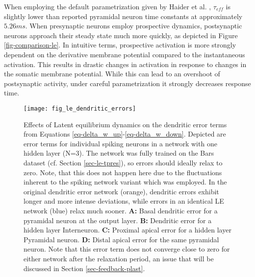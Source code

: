 When employing the default parametrization given by Haider et al. , $\tau_{eff}$ is
slightly lower than reported pyramidal neuron time constants \citep{McCormick1985} at approximately $5.26ms$. When
presynaptic neurons employ prospective dynamics, postsynaptic neurons approach their steady state much more quickly, as
depicted in Figure \ref{fig-comparison-le}. In intuitive terms, prospective activation is more strongly dependent on the
derivative membrane potential compared to the instantaneous activation. This results in drastic changes in activation
in response to changes in the somatic membrane potential. While this can lead to an overshoot of postsynaptic activity,
under careful parametrization it strongly decreases response time.   


\begin{figure}[h]
  \centering
  \texttt{[image: fig\_le\_dendritic\_errors]}
  \caption{Effects of Latent equilibrium dynamics on the dendritic error terms from Equations
    \ref{eq-delta_w_up}-\ref{eq-delta_w_down}. Depicted are error terms for individual spiking neurons in a network with
    one hidden layer (N=3). The network was fully trained on the Bars dataset (cf. Section \ref{sec-le-tpres}), so
    errors should ideally relax to zero. Note, that this does not happen here due to the fluctuations inherent to the
    spiking network variant which was employed. In the original dendritic error network (orange), dendritic errors
    exhibit longer and more intense deviations, while errors in an identical LE network (blue) relax much sooner.
    \textbf{A:} Basal dendritic error for a pyramidal neuron at the output layer. \textbf{B:} Dendritic error for a
    hidden layer Interneuron. \textbf{C:} Proximal apical error for a hidden layer Pyramidal neuron. \textbf{D:} Distal
    apical error for the same pyramidal neuron. Note that this error term does not converge close to zero for either
    network after the relaxation period, an issue that will be discussed in Section \ref{sec-feedback-plast}.}
  \label{fig-error-comp-le}
\end{figure}


